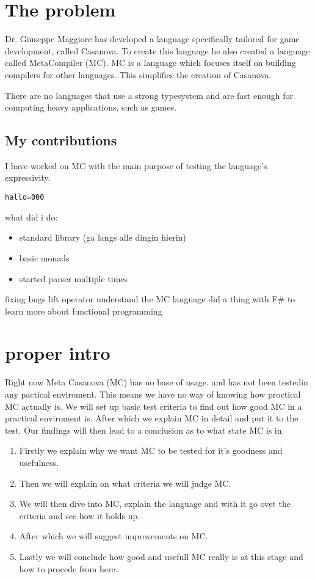 \section{The problem}
Dr. Giuseppe Maggiore has developed a language specifically tailored for game development, called Casanova. To create this language he also created a language called MetaCompiler (MC). MC is a language which focuses itself on building compilers for other languages. This simplifies the creation of Casanova.

There are no languages that use a strong typesystem and are fast enough for computing heavy applications, such as games.

\subsection{My contributions}
I have worked on MC with the main purpose of testing the language's expressivity.
\begin{lstlisting}
hallo=000
\end{lstlisting}


what did i do:
\begin{itemize}
	\item standard library (ga langs alle dingin hierin)
	\item basic monads
	\item started parser multiple times
\end{itemize}


fixing bugs
lift operator
understand the MC language
did a thing with F\# to learn more about functional programming



\section{proper intro}

Right now Meta Casanova (MC) has no base of usage. and has not been testedin any pactical enviroment. This means we have no way of knowing how proctical MC actually is. We will set up basic test criteria to find out how good MC in a practical enviroment is. After which we explain MC in detail and put it to the test. Our findings will then lead to a conclusion as to what state MC is in.

\begin{enumerate}
	\item Firstly we explain why we want MC to be tested for it's goodness and usefulness.
	\item Then we will explain on what criteria we will judge MC.
	\item We will then dive into MC, explain the language and with it go ovet the criteria and see how it holds up.
	\item After which we will suggest improvements on MC.
	\item Lastly we will conclude how good and usefull MC really is at this stage and how to procede from here.
\end{enumerate}
